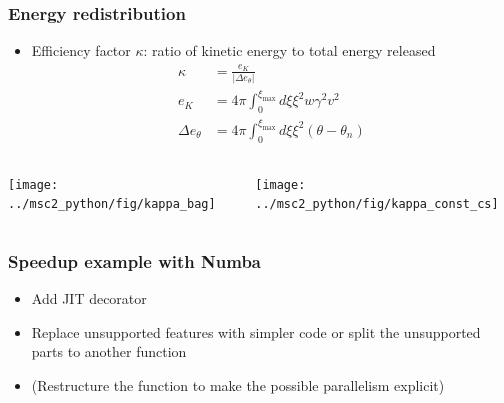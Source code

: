 \begin{frame}
    \frametitle{Energy redistribution}
    \begin{itemize}
        \item Efficiency factor $\kappa$: ratio of kinetic energy to total energy released
        \begin{align}
            \kappa &= \frac{e_K}{|\Delta e_\theta|} \\
            e_K &= 4 \pi \int_0^{\xi_\text{max}} d\xi \xi^2 w \gamma^2 v^2 \\
            \Delta e_{\theta} &= 4 \pi \int_0^{\xi_\text{max}} d\xi \xi^2 (\theta - \theta_n)
        \end{align}
    \end{itemize}
    \begin{columns}
    \begin{column}{0.35\textwidth}
        \texttt{[image: ../msc2\_python/fig/kappa\_bag]}
    \end{column}
    \begin{column}{0.35\textwidth}
        \texttt{[image: ../msc2\_python/fig/kappa\_const\_cs]}
    \end{column}
    \end{columns}
\end{frame}

\begin{frame}
    \frametitle{Speedup example with Numba}
    \begin{itemize}
        \item Add JIT decorator
        \item Replace unsupported features with simpler code or split the unsupported parts to another function
        \item (Restructure the function to make the possible parallelism explicit)
    \end{itemize}
    {
        \scriptsize
        
    }
\end{frame}
